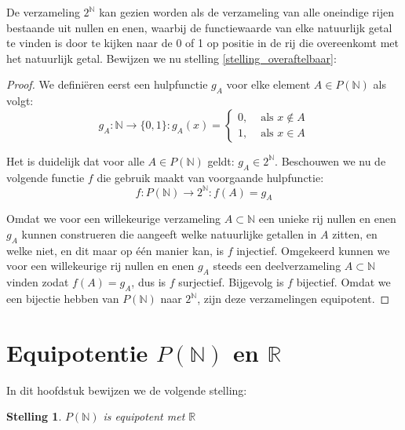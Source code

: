\documentclass[hidelinks,11pt,a4paper]{article}
\newtheorem{stelling}{Stelling}
\begin{document}
De verzameling $2^{\mathbb{N}}$ kan gezien worden als de verzameling van alle oneindige rijen bestaande uit nullen en enen, waarbij de functiewaarde van elke natuurlijk getal te vinden is door te kijken naar de 0 of 1 op positie in de rij die overeenkomt met het natuurlijk getal. 
Bewijzen we nu stelling \ref{stelling_overaftelbaar}: 

\begin{proof}
We defini\"eren eerst een hulpfunctie $g_A$ voor elke element $A \in P(\mathbb{N})$ als volgt: 
\begin{equation}
  g_A: \mathbb{N} \rightarrow \{0,1\}: 
  g_A(x) = \left\{  
  \begin{aligned}
  0, &\text{ als } x \notin A \\
  1, &\text{ als } x \in A
  \end{aligned}
  \right.
\end{equation}

Het is duidelijk dat voor alle $A\in P(\mathbb{N})$ geldt: $g_A \in 2^{\mathbb{N}}$. 
Beschouwen we nu de volgende functie $f$ die gebruik maakt van voorgaande hulpfunctie: 
\begin{equation}
\label{fun_nat2_binstring}
f: P(\mathbb{N}) \rightarrow  2^{\mathbb{N}}: f(A) = g_A 
\end{equation}

Omdat we voor een willekeurige verzameling $A \subset \mathbb{N}$ een unieke rij nullen en enen $g_A$ kunnen construeren die aangeeft welke natuurlijke getallen in $A$ zitten, en welke niet, en dit maar op \'e\'en manier kan, is $f$ injectief. 
Omgekeerd kunnen we voor een willekeurige rij nullen en enen $g_A$ steeds een deelverzameling $A \subset \mathbb{N}$ vinden zodat $f(A)=g_A$, dus is $f$ surjectief. Bijgevolg is $f$ bijectief. 
Omdat we een bijectie hebben van $P(\mathbb{N})$ naar $2^{\mathbb{N}}$, zijn deze verzamelingen equipotent. 
\end{proof}

\section{Equipotentie \texorpdfstring{$P(\mathbb{N})$}{} en \texorpdfstring{$\mathbb{R}$}{}}

In dit hoofdstuk bewijzen we de volgende stelling: 
\begin{stelling}
\label{st_bonus}
$P(\mathbb{N})$ is equipotent met $\mathbb{R}$ 
\end{stelling}
\end{document}
